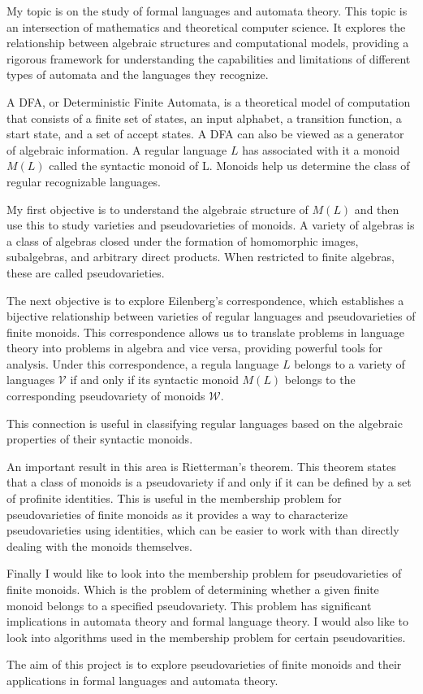 My topic is on the study of formal languages and automata theory. This topic is an intersection of mathematics and theoretical computer science. It explores the relationship between
algebraic structures and computational models, providing a rigorous framework for understanding the capabilities and limitations of different types of automata and the languages they recognize.

A DFA, or Deterministic Finite Automata, is a theoretical model of computation that consists of a finite set of states, an input alphabet, a transition function, a start state, and a set of accept states. A DFA can also be viewed as a generator of algebraic information.
A regular language $L$ has associated with it a monoid $M(L)$ called the syntactic monoid of L.
Monoids help us determine the class of regular recognizable languages.

My first objective is to understand the algebraic structure of $M(L)$ and then use this to study varieties and pseudovarieties of monoids.
A variety of algebras is a class of algebras closed under the formation of homomorphic images, subalgebras, and arbitrary direct products. When restricted to finite algebras, these are called pseudovarieties.

The next objective is to explore Eilenberg's correspondence, which establishes a bijective relationship between varieties of regular languages and pseudovarieties of finite monoids.
This correspondence allows us to translate problems in language theory into problems in algebra and vice versa, providing powerful tools for analysis. Under this correspondence, a regula language $L$
belongs to a variety of languages $\mathcal{V}$ if and only if its syntactic monoid $M(L)$ belongs to the corresponding pseudovariety of monoids $\mathcal{W}$.

This connection is useful in classifying regular languages based on the algebraic properties of their syntactic monoids.

An important result in this area is Rietterman's theorem. This theorem states that a class of monoids is a pseudovariety if and only if it can be defined by a set of profinite identities. This is useful in the membership problem for pseudovarieties of finite monoids 
as it provides a way to characterize pseudovarieties using identities, which can be easier to work with than directly dealing with the monoids themselves.

Finally I would like to look into the membership problem for pseudovarieties of finite monoids. Which is the problem of determining whether a given finite monoid belongs to a specified pseudovariety.
This problem has significant implications in automata theory and formal language theory. I would also like to look into algorithms used in the membership problem for certain pseudovarities.

\begin{framed}
    The aim of this project is to explore pseudovarieties of finite monoids and their applications in formal languages and automata theory.
\end{framed}
